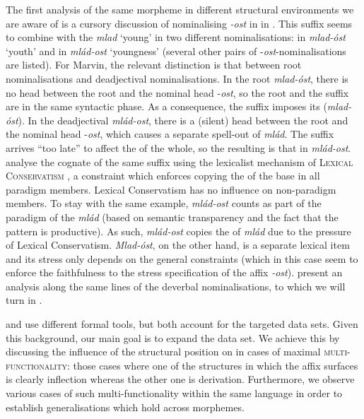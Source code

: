 \documentclass[output=paper, colorlinks, citecolor=brown, newtxmath]{langsci/langscibook}
\begin{document}
The first analysis of the same morpheme in different structural environments we are aware of is a cursory discussion of nominalising \textit{-ost} in  in \citet{Mar2002}. This suffix seems to combine with the  \textit{mlad} `young' in two different nominalisations: in \textit{mlad-óst} `youth' and in \textit{mlád-ost} `youngness' (several other pairs of -\textit{ost}-nominalisations are listed). For Marvin, the relevant distinction is that between root nominalisations and deadjectival nominalisations. In the root  \textit{mlad-}\textit{óst}, there is no  head between the root and the nominal head -\textit{ost}, so the root and the suffix are in the same syntactic phase. As a consequence, the suffix imposes its  (\textit{mlad-óst}). In the deadjectival  \textit{mlád-ost}, there is a (silent)  head between the root and the nominal head -\textit{ost}, which causes a separate spell-out of \textit{mlád}. The suffix arrives “too late” to affect the  of the whole, so the resulting  is that in \textit{mlád-}\textit{ost}. \citet{Arsim2013} analyse the  cognate of the same suffix using the lexicalist mechanism of \textsc{Lexical Conservatism} \citep[first proposed in][]{Ste1997}, a constraint which enforces copying the  of the base in all paradigm members. Lexical Conservatism has no influence on non-paradigm members. To stay with the same  example, \textit{mlád-}\textit{ost} counts as part of the paradigm of  the  \textit{mlád} (based on semantic transparency and the fact that the pattern is productive). As such, \textit{mlád-}\textit{ost} copies the  of \textit{mlád} due to the pressure of Lexical Conservatism. \textit{Mlad-}\textit{óst}, on the other hand, is a separate lexical item and its stress only depends on the general constraints (which in this case seem to enforce the faithfulness to the stress specification of the affix \textit{-ost}). \citet{Sim2014} present an analysis along the same lines of the  deverbal nominalisations, to which we will turn in .

\citet{Mar2002} and \citet{Arsim2013} use different formal tools, but both account for the targeted data sets. Given this background, our main goal is to expand the data set. We achieve this by discussing the influence of the structural position on  in cases of maximal \textsc{multi-functionality}: those cases where one of the structures in which the affix surfaces is clearly inflection whereas the other one is derivation. Furthermore, we observe various cases of such multi-functionality within the same language in order to establish generalisations which hold across morphemes.
\end{document}
